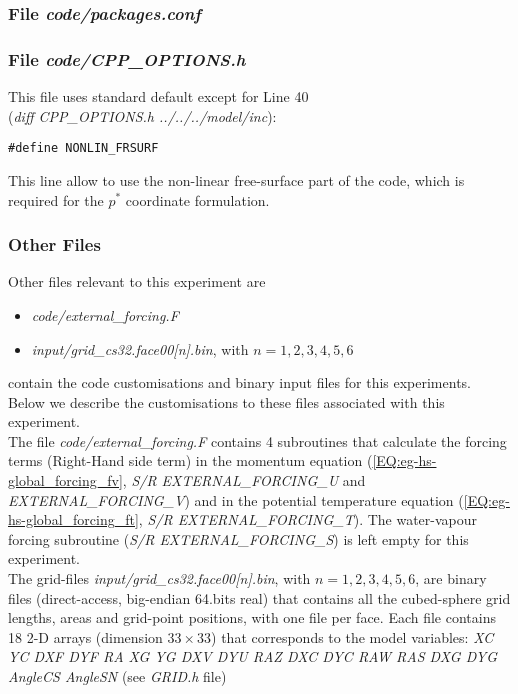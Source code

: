 %

\subsubsection{File {\it code/packages.conf}}
\label{www:tutorials}



\begin{small}

\end{small}

\subsubsection{File {\it code/CPP\_OPTIONS.h}}
\label{www:tutorials}

This file uses standard default except for Line 40\\
({\it diff CPP\_OPTIONS.h ../../../model/inc}):
\begin{verbatim}
#define NONLIN_FRSURF 
\end{verbatim}
This line allow to use the non-linear free-surface part of the code,
which is required for the $p^*$ coordinate formulation.

\subsubsection{Other Files }
\label{www:tutorials}

Other files relevant to this experiment are
\begin{itemize}
\item {\it code/external\_forcing.F}
\item {\it input/grid\_cs32.face00[n].bin}, with $n=1,2,3,4,5,6$
\end{itemize}
contain the code customisations and binary input files for this 
experiments. Below we describe the customisations
to these files associated with this experiment.\\

The file {\it code/external\_forcing.F} contains 4 subroutines
that calculate the forcing terms (Right-Hand side term) in the
momentum equation (\ref{EQ:eg-hs-global_forcing_fv}, 
{\it S/R EXTERNAL\_FORCING\_U} and {\it EXTERNAL\_FORCING\_V})
and in the potential temperature equation 
(\ref{EQ:eg-hs-global_forcing_ft}, {\it S/R  EXTERNAL\_FORCING\_T}). 
The water-vapour forcing subroutine ({\it S/R EXTERNAL\_FORCING\_S})
is left empty for this experiment.\\

The grid-files {\it input/grid\_cs32.face00[n].bin}, with $n=1,2,3,4,5,6$,
are binary files (direct-access, big-endian 64.bits real) that 
contains all the cubed-sphere grid lengths, areas and grid-point
positions, with one file per face.
Each file contains 18 2-D arrays (dimension $33 \times 33$) that corresponds 
to the model variables:
{\it 
XC YC DXF DYF RA XG YG DXV DYU RAZ DXC DYC RAW RAS DXG DYG AngleCS AngleSN 
}
(see {\it GRID.h} file)

